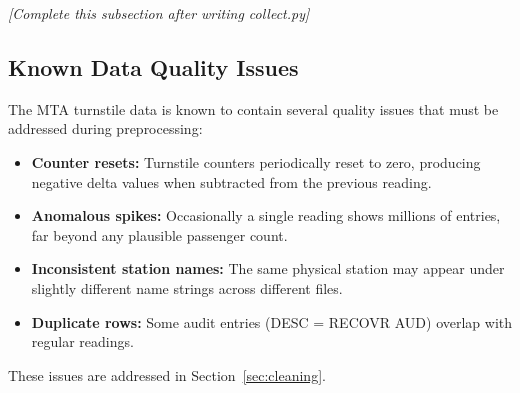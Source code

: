 
\textit{[Complete this subsection after writing collect.py]}

\subsection{Known Data Quality Issues}

The MTA turnstile data is known to contain several quality issues that must be
addressed during preprocessing:

\begin{itemize}
    \item \textbf{Counter resets:} Turnstile counters periodically reset to zero,
          producing negative delta values when subtracted from the previous reading.
    \item \textbf{Anomalous spikes:} Occasionally a single reading shows millions
          of entries, far beyond any plausible passenger count.
    \item \textbf{Inconsistent station names:} The same physical station may appear
          under slightly different name strings across different files.
    \item \textbf{Duplicate rows:} Some audit entries (DESC = RECOVR AUD) overlap
          with regular readings.
\end{itemize}

These issues are addressed in Section~\ref{sec:cleaning}.
